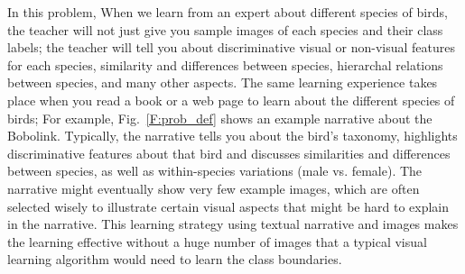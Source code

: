 In this problem, When we learn from an expert about different species of birds, the teacher will not just give you sample images of each species and their class labels; the teacher will tell you about discriminative visual or non-visual features for each species, similarity and differences between species, hierarchal relations between species, and many other aspects. The same learning experience takes place when you read a book or a web page to learn about the different species of birds; For example, Fig.~\ref{F:prob_def} shows an example narrative about the {\sf Bobolink}. Typically, the narrative tells you about the bird's taxonomy, highlights discriminative features about that bird and discusses similarities and differences between species, as well as within-species variations (male vs. female). The narrative might eventually show very few example images, which are often selected wisely to illustrate certain visual aspects that might be hard to explain in the narrative.  This learning strategy using textual narrative and images makes the learning effective without a huge number of images  that a typical visual learning algorithm would need to learn the class boundaries. 
 
 





 

%

